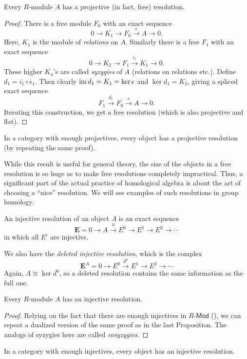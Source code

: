 \begin{prop}
    Every $R$-module $A$ has a projective (in fact, free) resolution. 
\end{prop}
\begin{proof}
     There is a free module $F_0$ with an exact sequence
     \[0\to K_1\to F_0\overset\epsilon\to A\to 0.\]
     Here, $K_1$ is the module of \emph{relations} on $A$. Similarly there is a free $F_1$ with an exact sequence
     \[0\to K_2\to F_1\overset{\epsilon_1}\to K_1\to 0.\]
     These higher $K_n$'s are called \emph{syzygies} of $A$ (relations on relations etc.).
     Define $d_1=i_1\circ\epsilon_1$. Then clearly $\operatorname{im} d_1=K_1=\ker\epsilon$ and $\ker d_1=K_2$, giving a spliced exact sequence
     \[F_1\overset{d_1}\to F_0\overset\epsilon\to A\to 0.\]
     Iterating this construction, we get a free resolution (which is also projective and flat).
\end{proof}
\begin{cor}
    In a category with enough projectives, every object has a projective resolution (by repeating the same proof).
\end{cor}

\begin{rem}
    While this result is useful for general theory, the size of the objects in a free resolution is so huge as to make free resolutions completely impractical. Thus, a significant part of the actual practice of homological algebra is about the art of choosing a ``nice'' resolution. We will see examples of such resolutions in group homology.
\end{rem}

\begin{defn}
    An injective resolution of an object $A$ is an exact sequence
    \[\bm{E}=0\to A\overset\eta\to E^0\to E^1\to E^2\to \cdots\]
    in which all $E^i$ are injective.
    
    We also have the \emph{deleted injective resolution}, which is the complex
    \[\bm{E}^A=0\to E^0\overset{d^0}\to E^1\to E^2\to \cdots\]
    Again, $A\cong\ker d^0$, so a deleted resolution contains the same information as the full one.
\end{defn}

\begin{prop}
    Every $R$-module $A$ has an injective resolution.
\end{prop}
\begin{proof}
     Relying on the fact that there are enough injectives in $R\text{-}\mathsf{Mod}$ (\cite[Thm. 3.38]{Rotman}), we can repeat a dualized version of the same proof as in the last Proposition. The analogs of syzygies here are called \emph{cosyzygies}.
\end{proof}
\begin{cor}
    In a category with enough injectives, every object has an injective resolution.
\end{cor}

